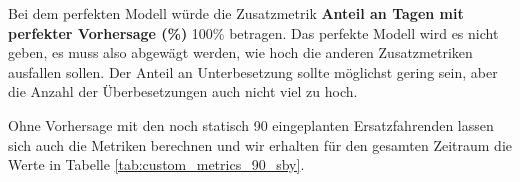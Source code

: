 \documentclass[%
pdftex,
oneside,			%
11pt,				%
parskip=half,		%
headheight = 12pt,	%
headsepline,		%
footsepline,		%
footheight = 16pt,	%
abstracton,		%
DIV=calc,		%
BCOR=8mm,		%
headinclude=false,	%
footinclude=false,	%
listof=totoc,		%
toc=bibliography,	%
]{scrreprt}	%
\begin{document}
        Bei dem perfekten Modell würde die Zusatzmetrik \textbf{Anteil an Tagen mit perfekter Vorhersage (\%)} 100\% betragen.
        Das perfekte Modell wird es nicht geben, es muss also abgewägt werden, wie hoch die anderen Zusatzmetriken ausfallen sollen.
        Der Anteil an Unterbesetzung sollte möglichst gering sein, aber die Anzahl der Überbesetzungen auch nicht viel zu hoch.

        Ohne Vorhersage mit den noch statisch 90 eingeplanten Ersatzfahrenden lassen sich auch die Metriken berechnen und wir erhalten für den gesamten Zeitraum die Werte in Tabelle \ref{tab:custom_metrics_90_sby}.


\end{document}
